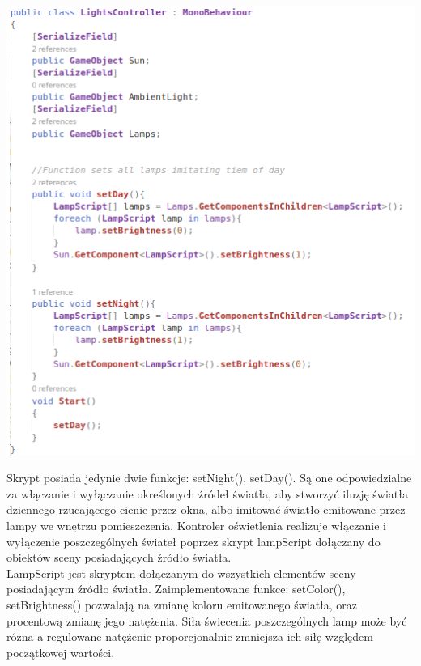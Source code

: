 \documentclass{article} %
\begin{document}
            
            \includegraphics[bb=0 0 507 558,scale=0.55,keepaspectratio=true]{images/screenshots/code/code_002.png}
           

            Skrypt posiada jedynie dwie funkcje: setNight(), setDay(). Są one odpowiedzialne za włączanie i wyłączanie określonych źródeł światła, aby stworzyć iluzję światła dziennego rzucającego cienie przez okna, albo imitować światło emitowane przez lampy we wnętrzu pomieszczenia. Kontroler oświetlenia realizuje włączanie i wyłączenie poszczególnych świateł poprzez skrypt lampScript dołączany do obiektów sceny posiadających źródło światła.
            \\
            
            LampScript jest skryptem dołączanym do wszystkich elementów sceny posiadającym źródło światła. Zaimplementowane funkce: setColor(), setBrightness() pozwalają na zmianę koloru emitowanego światła, oraz procentową zmianę jego natężenia. Siła świecenia poszczególnych lamp może być różna a regulowane natężenie proporcjonalnie zmniejsza ich siłę względem początkowej wartości.
            \\
            
\end{document}
